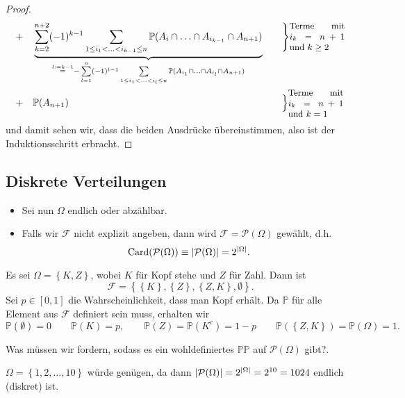 \begin{proof}
\begin{alignat*}{5}
           &+& &\underbrace{\sum_{k=2}^{n+2} (-1)^{k-1} \sum_{1\leq i_1<\ldots<i_{k-1}\leq n} \mathbb{P}(A_i \cap \ldots \cap A_{i_{k-1}} \cap A_{n+1})}_{\stackrel{l := k-1}{=} -\sum\limits_{l=1}^n (-1)^{l-1}\sum\limits_{1\leq i_1<...<i_l\leq n} \mathbb{P}(A_{i_1} \cap \ldots \cap A_{i_l} \cap A_{n+1})}& \quad &\Bigg\}\text{\parbox{2cm}{\small Terme mit $i_k = n+1$ und  $k\geq 2$}}\\
           &+& & \mathbb{P}(A_{n+1}) \qquad& \quad  &\Big\}\text{\parbox{2cm}{\small Terme mit $i_k = n+1$ und  $k=1$}}
    \end{alignat*}
    und damit sehen wir, dass die beiden Ausdrücke übereinstimmen, also ist der Induktionsschritt erbracht.
\end{proof}


\subsection{Diskrete Verteilungen}
\begin{itemize}
    \item Sei nun $\Omega$ endlich oder abzählbar.
    \item Falls wir $\mathcal{F}$ nicht explizit angeben, dann wird $\mathcal{F} = \mathcal{P}(\Omega)$ gewählt, d.h.
        \[
            \operatorname{Card} (\mathcal{P}(\Omega)) \equiv \lvert\mathcal{P}(\Omega)\rvert = 2 ^{ \lvert\Omega\rvert} 
        .\] 
\end{itemize}
\begin{example}[Münzwurf]
    Es sei $\Omega = \left \{K,Z\right\}$, wobei $K$ für Kopf stehe und $Z$ für Zahl. Dann ist
    \[
    \mathcal{F} = \left \{\left \{K\right\} ,\left \{Z\right\} ,\left \{Z,K\right\} ,\emptyset\right\} 
    .\] 
    Sei $p\in [0,1]$ die Wahrscheinlichkeit, dass man Kopf erhält. Da $\mathbb{P}$ für alle Element aus $\mathcal{F}$ definiert sein muss, erhalten wir
    \[
        \mathbb{P}(\emptyset) = 0 \qquad \mathbb{P}(K) = p, \qquad \mathbb{P}(Z) = \mathbb{P}(K^{c}) = 1-p \qquad \mathbb{P}(\left \{Z,K\right\} ) = \mathbb{P}(\Omega) = 1
    .\] 
\end{example}

Was müssen wir fordern, sodass es ein wohldefiniertes $\mathbb{P}\mathbb{P}$ auf $\mathcal{P}(\Omega)$ gibt?.
\begin{example}
    $\Omega = \left \{1,2,\ldots,10\right\}$ würde genügen, da dann $\lvert\mathcal{P}(\Omega)\rvert= 2^{\lvert\Omega\rvert }=2^{10} = 1024 $
    endlich (diskret) ist.
\end{example}

